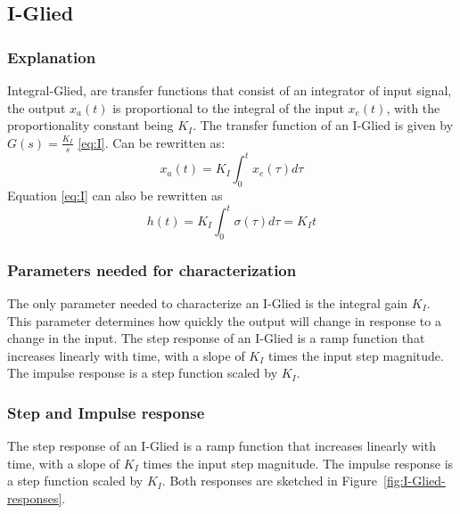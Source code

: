 \documentclass[12pt, oneside, a4paper]{scrreprt}
\begin{document}
            \cleardoublepage
            
            \subsection{I-Glied}
                \subsubsection{Explanation}

                    Integral-Glied, are transfer functions that consist of an integrator of input signal, the output $x_a(t)$ is proportional to the integral of the input $x_e(t)$, with the proportionality constant being $K_I$. The transfer function of an I-Glied is given by $G(s) = \frac{K_I}{s}$ \ref{eq:I}. Can be rewritten as:
                    \begin{equation}
                        x_a(t) = K_I \int_0^t x_e(\tau) d\tau
                    \end{equation}
                    Equation \ref{eq:I} can also be rewritten as
                    \begin{equation}                    
                        h(t) = K_I \int_0^t \sigma(\tau) d\tau = K_I t
                    \end{equation}                 

                \subsubsection{Parameters needed for characterization}
                    The only parameter needed to characterize an I-Glied is the integral gain $K_I$. This parameter determines how quickly the output will change in response to a change in the input. The step response of an I-Glied is a ramp function that increases linearly with time, with a slope of $K_I$ times the input step magnitude. The impulse response is a step function scaled by $K_I$.

                \subsubsection{Step and Impulse response}
                    The step response of an I-Glied is a ramp function that increases linearly with time, with a slope of $K_I$ times the input step magnitude. The impulse response is a step function scaled by $K_I$. Both responses are sketched in Figure~\ref{fig:I-Glied-responses}.
\end{document}
